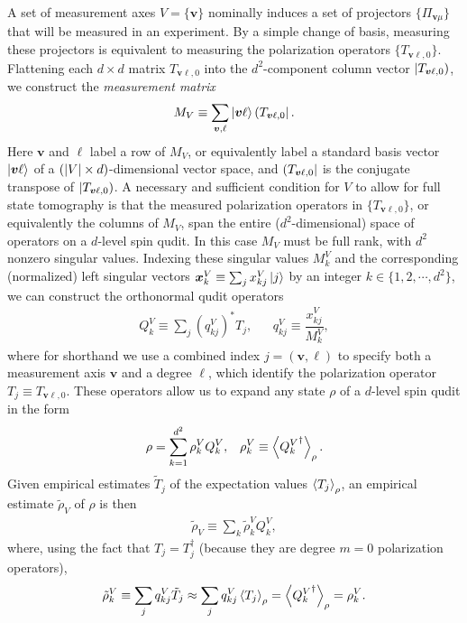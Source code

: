 \documentclass[a4paper,twocolumn,unpublished]{quantumarticle}
\newcommand{\f}[2]{\dfrac{#1}{#2}} %
\newcommand{\p}[1]{\left(#1\right)} %
\newcommand{\bk}{\Braket} %
\renewcommand{\set}[1]{\{#1\}} %
\def\obra#1{\mathinner{({#1}|}}
\def\oket#1{\mathinner{|{#1})}}
\begin{document}
A set of measurement axes $V=\set{\bm v}$ nominally induces a set of projectors $\set{\Pi_{\bm v\mu}}$ that will be measured in an experiment.
By a simple change of basis, measuring these projectors is equivalent to measuring the polarization operators $\set{T_{\bm v\ell,0}}$.
Flattening each $d\times d$ matrix $T_{\bm v\ell,0}$ into the $d^2$-component column vector $\oket{T_{\bm v\ell,0}}$, we construct the {\it measurement matrix}
\begin{align}
  M_V \equiv \sum_{\bm v,\ell} \ket{\bm v\ell} \obra{T_{\bm v\ell,0}}.
  \label{eq:meas_mat}
\end{align}
Here $\bm v$ and $\ell$ label a row of $M_V$, or equivalently label a standard basis vector $\ket{\bm v\ell}$ of a $\p{\abs{V}\times d}$-dimensional vector space, and $\obra{T_{\bm v\ell,0}}$ is the conjugate transpose of $\oket{T_{\bm v\ell,0}}$.
A necessary and sufficient condition for $V$ to allow for full state tomography is that the measured polarization operators in $\set{T_{\bm v\ell,0}}$, or equivalently the columns of $M_V$, span the entire ($d^2$-dimensional) space of operators on a $d$-level spin qudit.
In this case $M_V$ must be full rank, with $d^2$ nonzero singular values.
Indexing these singular values $M^V_k$ and the corresponding (normalized) left singular vectors $\bm x^V_k\equiv \sum_j x^V_{kj} \ket{j}$ by an integer $k\in\set{1,2,\cdots,d^2}$, we can construct the orthonormal qudit operators
\begin{align}
  Q^V_k \equiv \sum_j \p{q^V_{kj}}^* T_j,
  &&
  q^V_{kj} \equiv \f{x^V_{kj}}{M^V_k},
\end{align}
where for shorthand we use a combined index $j=\p{\bm v,\ell}$ to specify both a measurement axis $\bm v$ and a degree $\ell$, which identify the polarization operator $T_j\equiv T_{\bm v\ell,0}$.
These operators allow us to expand any state $\rho$ of a $d$-level spin qudit in the form
\begin{align}
  \rho = \sum_{k=1}^{d^2} \rho_k^V Q_k^V,
  &&
  \rho_k^V \equiv \bk{{Q^V_k}^\dag}_\rho.
\end{align}
Given empirical estimates $\tilde T_j$ of the expectation values $\bk{T_j}_\rho$, an empirical estimate $\tilde\rho_V$ of $\rho$ is then
\begin{align}
  \tilde\rho_V \equiv \sum_k \tilde\rho^V_k Q^V_k,
  \label{eq:reconstructed_state}
\end{align}
where, using the fact that $T_j=T_j^\dag$ (because they are degree $m=0$ polarization operators),
\begin{align}
  \tilde\rho^V_k \equiv \sum_j q^V_{kj} \tilde T_j
  \approx \sum_j q^V_{kj} \bk{T_j}_\rho
  = \bk{{Q^V_k}^\dag}_\rho
  = \rho^V_k.
\end{align}
\end{document}
